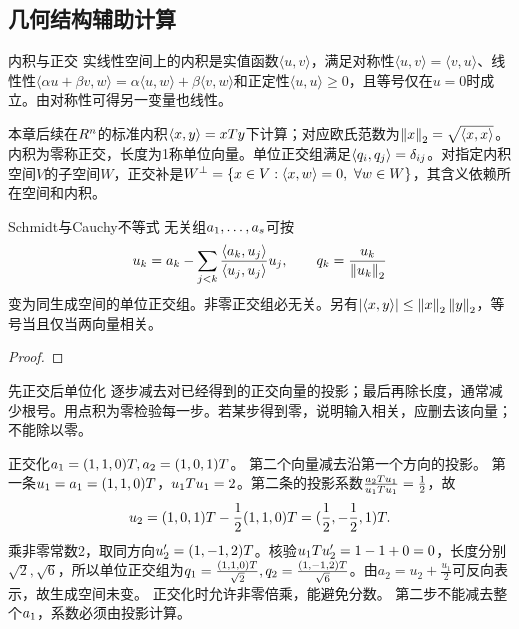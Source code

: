 \subsection{几何结构辅助计算}
\begin{definition}{内积与正交}
实线性空间上的内积是实值函数$\langle u,v\rangle$，满足对称性$\langle u,v\rangle=\langle v,u\rangle$、线性性$\langle\alpha u+\beta v,w\rangle=\alpha\langle u,w\rangle+\beta\langle v,w\rangle$和正定性$\langle u,u\rangle\ge0$，且等号仅在$u=0$时成立。由对称性可得另一变量也线性。

本章后续在$R^n$的标准内积$\langle x,y\rangle=xTy$下计算；对应欧氏范数为$\left\lVert x\right\rVert_2=\sqrt{\langle x,x\rangle}$。内积为零称正交，长度为1称单位向量。单位正交组满足$\langle q_i,q_j\rangle=\delta_{ij}$。对指定内积空间$V$的子空间$W$，正交补是$W^\perp=\{\vx\in V:\langle\vx,\vw\rangle=0,\ \forall\vw\in W\}$，其含义依赖所在空间和内积。
\end{definition}
\begin{theorem}{Schmidt与Cauchy不等式}
无关组$a_1,\ldots,a_s$可按
\begin{equation}u_k=a_k-\sum_{j<k}\dfrac{\langle a_k,u_j\rangle}{\langle u_j,u_j\rangle}u_j,
\qquad q_k=\dfrac{u_k}{\left\lVert u_k\right\rVert_2}\label{eq:gs}\end{equation}
变为同生成空间的单位正交组。非零正交组必无关。另有$\left|\langle x,y\rangle\right|\le\left\lVert x\right\rVert_2\left\lVert y\right\rVert_2$，等号当且仅当两向量相关。
\end{theorem}
\begin{proof}

\end{proof}
\begin{method}{先正交后单位化}
逐步减去对已经得到的正交向量的投影；最后再除长度，通常减少根号。用点积为零检验每一步。若某步得到零，说明输入相关，应删去该向量；不能除以零。
\end{method}
{正交化$a_1=(1,1,0)T,a_2=(1,0,1)T$。}
{第二个向量减去沿第一个方向的投影。}
{第一条$u_1=a_1=(1,1,0)T$，$u_1T u_1=2$。第二条的投影系数$\frac{a_2T u_1}{u_1T u_1}=\frac{1}{2}$，故
\[u_2=(1,0,1)T-\dfrac12(1,1,0)T=(\dfrac{1}{2},-\dfrac{1}{2},1)T.\]
乘非零常数2，取同方向$u_2'=(1,-1,2)T$。核验$u_1T u_2'=1-1+0=0$，长度分别$\sqrt2,\sqrt6$，所以单位正交组为$q_1=\frac{(1,1,0)T}{\sqrt2},q_2=\frac{(1,-1,2)T}{\sqrt6}$。由$a_2=u_2+\frac{u_1}{2}$可反向表示，故生成空间未变。}
{正交化时允许非零倍乘，能避免分数。}
{第二步不能减去整个$a_1$，系数必须由投影计算。}
